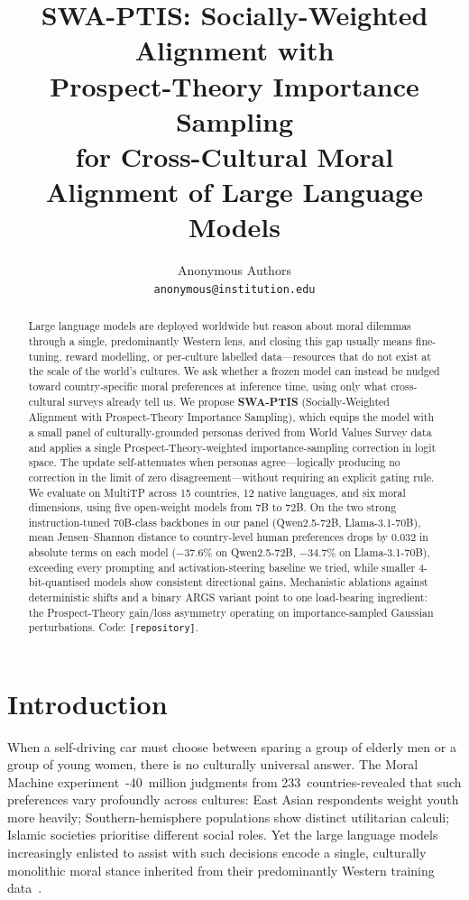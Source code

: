 \documentclass{article}
\title{%
  \textbf{SWA-PTIS}: Socially-Weighted Alignment with\\
  Prospect-Theory Importance Sampling\\
  for Cross-Cultural Moral Alignment of Large Language Models%
}
\author{%
  Anonymous Authors\\
  \texttt{anonymous@institution.edu}
}
\begin{document}
\maketitle

\begin{abstract}
Large language models are deployed worldwide but reason about moral dilemmas through a single, predominantly Western lens, and closing this gap usually means fine-tuning, reward modelling, or per-culture labelled data---resources that do not exist at the scale of the world's cultures. We ask whether a frozen model can instead be nudged toward country-specific moral preferences at inference time, using only what cross-cultural surveys already tell us. We propose \textbf{SWA-PTIS} (Socially-Weighted Alignment with Prospect-Theory Importance Sampling), which equips the model with a small panel of culturally-grounded personas derived from World Values Survey data and applies a single Prospect-Theory-weighted importance-sampling correction in logit space. The update self-attenuates when personas agree---logically producing no correction in the limit of zero disagreement---without requiring an explicit gating rule. We evaluate on MultiTP across 15 countries, 12 native languages, and six moral dimensions, using five open-weight models from 7B to 72B. On the two strong instruction-tuned 70B-class backbones in our panel (Qwen2.5-72B, Llama-3.1-70B), mean Jensen--Shannon distance to country-level human preferences drops by $0.032$ in absolute terms on each model ($-37.6\%$ on Qwen2.5-72B, $-34.7\%$ on Llama-3.1-70B), exceeding every prompting and activation-steering baseline we tried, while smaller 4-bit-quantised models show consistent directional gains. Mechanistic ablations against deterministic shifts and a binary ARGS variant point to one load-bearing ingredient: the Prospect-Theory gain/loss asymmetry operating on importance-sampled Gaussian perturbations. Code: \texttt{[repository]}.
\end{abstract}

\section{Introduction}
\label{sec:intro}

When a self-driving car must choose between sparing a group of elderly men or a
group of young women, there is no culturally universal answer. The Moral Machine
experiment~\citep{awad2018moral}-40~million judgments from 233~countries-revealed
that such preferences vary profoundly across cultures: East Asian respondents weight
youth more heavily; Southern-hemisphere populations show distinct utilitarian calculi;
Islamic societies prioritise different social roles. Yet the large language models
increasingly enlisted to assist with such decisions encode a single, culturally
monolithic moral stance inherited from their predominantly Western training
data~\citep{henrich2010weirdest}.
\end{document}
